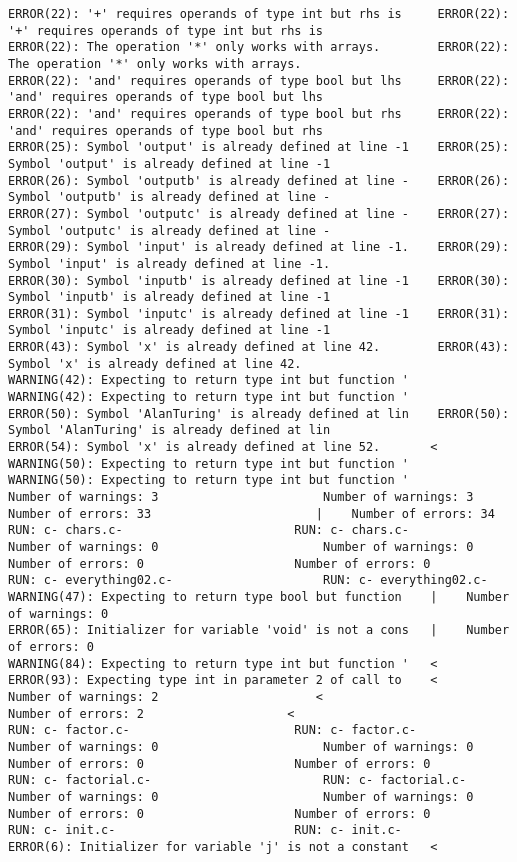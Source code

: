 \documentclass[12pt]{book}
\begin{document}
\begin{lstlisting}
ERROR(22): '+' requires operands of type int but rhs is 	ERROR(22): '+' requires operands of type int but rhs is 
ERROR(22): The operation '*' only works with arrays.		ERROR(22): The operation '*' only works with arrays.
ERROR(22): 'and' requires operands of type bool but lhs 	ERROR(22): 'and' requires operands of type bool but lhs 
ERROR(22): 'and' requires operands of type bool but rhs 	ERROR(22): 'and' requires operands of type bool but rhs 
ERROR(25): Symbol 'output' is already defined at line -1	ERROR(25): Symbol 'output' is already defined at line -1
ERROR(26): Symbol 'outputb' is already defined at line -	ERROR(26): Symbol 'outputb' is already defined at line -
ERROR(27): Symbol 'outputc' is already defined at line -	ERROR(27): Symbol 'outputc' is already defined at line -
ERROR(29): Symbol 'input' is already defined at line -1.	ERROR(29): Symbol 'input' is already defined at line -1.
ERROR(30): Symbol 'inputb' is already defined at line -1	ERROR(30): Symbol 'inputb' is already defined at line -1
ERROR(31): Symbol 'inputc' is already defined at line -1	ERROR(31): Symbol 'inputc' is already defined at line -1
ERROR(43): Symbol 'x' is already defined at line 42.		ERROR(43): Symbol 'x' is already defined at line 42.
WARNING(42): Expecting to return type int but function '	WARNING(42): Expecting to return type int but function '
ERROR(50): Symbol 'AlanTuring' is already defined at lin	ERROR(50): Symbol 'AlanTuring' is already defined at lin
ERROR(54): Symbol 'x' is already defined at line 52.	   <
WARNING(50): Expecting to return type int but function '	WARNING(50): Expecting to return type int but function '
Number of warnings: 3						Number of warnings: 3
Number of errors: 33					   |	Number of errors: 34
RUN: c- chars.c-						RUN: c- chars.c-
Number of warnings: 0						Number of warnings: 0
Number of errors: 0						Number of errors: 0
RUN: c- everything02.c-						RUN: c- everything02.c-
WARNING(47): Expecting to return type bool but function    |	Number of warnings: 0
ERROR(65): Initializer for variable 'void' is not a cons   |	Number of errors: 0
WARNING(84): Expecting to return type int but function '   <
ERROR(93): Expecting type int in parameter 2 of call to    <
Number of warnings: 2					   <
Number of errors: 2					   <
RUN: c- factor.c-						RUN: c- factor.c-
Number of warnings: 0						Number of warnings: 0
Number of errors: 0						Number of errors: 0
RUN: c- factorial.c-						RUN: c- factorial.c-
Number of warnings: 0						Number of warnings: 0
Number of errors: 0						Number of errors: 0
RUN: c- init.c-							RUN: c- init.c-
ERROR(6): Initializer for variable 'j' is not a constant   <

\end{lstlisting}
\end{document}
